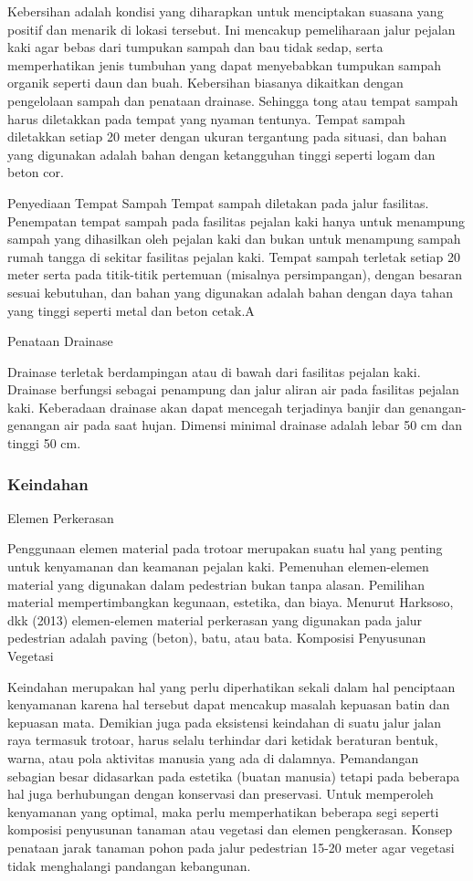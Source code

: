 \documentclass[../rumukota.tex]{subfiles}
\begin{document}
Kebersihan adalah kondisi yang diharapkan untuk menciptakan suasana yang positif dan menarik di lokasi tersebut. Ini mencakup pemeliharaan jalur pejalan kaki agar bebas dari tumpukan sampah dan bau tidak sedap, serta memperhatikan jenis tumbuhan yang dapat menyebabkan tumpukan sampah organik seperti daun dan buah. Kebersihan biasanya dikaitkan dengan pengelolaan sampah dan penataan drainase. Sehingga tong atau tempat sampah harus diletakkan pada tempat yang nyaman tentunya. Tempat sampah diletakkan setiap 20 meter dengan ukuran tergantung pada situasi, dan bahan yang digunakan adalah bahan dengan ketangguhan tinggi seperti logam dan beton cor.

\tabitem Penyediaan Tempat Sampah
Tempat sampah diletakan pada jalur fasilitas. Penempatan tempat sampah pada fasilitas pejalan kaki hanya untuk menampung sampah yang dihasilkan oleh pejalan kaki dan bukan untuk menampung sampah rumah tangga di sekitar fasilitas pejalan kaki. Tempat sampah terletak setiap 20 meter serta pada titik-titik pertemuan (misalnya persimpangan), dengan besaran sesuai kebutuhan, dan bahan yang digunakan adalah bahan dengan daya tahan yang tinggi seperti metal dan beton cetak.A

\tabitem Penataan Drainase

Drainase terletak berdampingan atau di bawah dari fasilitas pejalan kaki. Drainase berfungsi sebagai penampung dan jalur aliran air pada fasilitas pejalan kaki. Keberadaan drainase akan dapat mencegah terjadinya banjir dan genangan- genangan air pada saat hujan. Dimensi minimal drainase adalah lebar 50 cm dan tinggi 50 cm.

\subsubsection{Keindahan}%
\label{ssub:keindahan}

\tabitem Elemen Perkerasan

Penggunaan elemen material pada trotoar merupakan suatu hal yang penting untuk kenyamanan dan keamanan pejalan kaki. Pemenuhan elemen-elemen material yang digunakan dalam pedestrian bukan tanpa alasan. Pemilihan material mempertimbangkan kegunaan, estetika, dan biaya. Menurut Harksoso, dkk (2013) elemen-elemen material perkerasan yang digunakan pada jalur pedestrian adalah paving (beton), batu, atau bata.
\tabitem Komposisi Penyusunan Vegetasi

Keindahan merupakan hal yang perlu diperhatikan sekali dalam hal penciptaan kenyamanan karena hal tersebut dapat mencakup masalah kepuasan batin dan kepuasan mata. Demikian juga pada eksistensi keindahan di suatu jalur jalan raya termasuk trotoar, harus selalu terhindar dari ketidak beraturan bentuk, warna, atau pola aktivitas manusia yang ada di dalamnya. Pemandangan sebagian besar didasarkan pada estetika (buatan manusia) tetapi pada beberapa hal juga berhubungan dengan konservasi dan preservasi. Untuk memperoleh kenyamanan yang optimal, maka perlu memperhatikan beberapa segi seperti komposisi penyusunan tanaman atau vegetasi dan elemen pengkerasan. Konsep penataan jarak tanaman pohon pada jalur pedestrian 15-20 meter agar vegetasi tidak menghalangi pandangan kebangunan.
\end{document}
